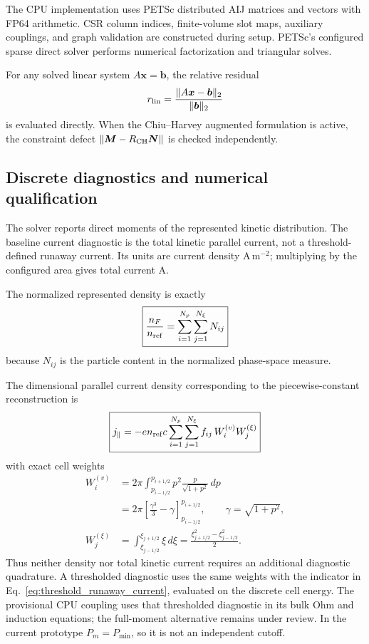 \documentclass[11pt]{article}
\begin{document}
The CPU implementation uses PETSc distributed AIJ matrices and vectors with FP64
arithmetic.  CSR column indices, finite-volume slot maps, auxiliary couplings, and graph
validation are constructed during setup.  PETSc's configured sparse direct solver
performs numerical factorization and triangular solves.

For any solved linear system $A\bm x=\bm b$, the relative residual
\begin{equation}
 r_{\rm lin}=\frac{\|A\bm x-\bm b\|_2}{\|\bm b\|_2}
 \label{eq:linear_residual}
\end{equation}
is evaluated directly.  When the Chiu--Harvey augmented formulation is active, the
constraint defect $\|\bm M-R_{\rm CH}\bm N\|$ is checked independently.

\subsection{Discrete diagnostics and numerical qualification}

The solver reports direct moments of the represented kinetic distribution.  The
baseline current diagnostic is the total kinetic parallel current, not a
threshold-defined runaway current.  Its units are current density
$\mathrm{A\,m^{-2}}$; multiplying by the configured area gives total current
$\mathrm{A}$.

The normalized represented density is exactly
\begin{equation}
 \boxed{
 \frac{n_F}{n_{\rm ref}}=\sum_{i=1}^{N_p}\sum_{j=1}^{N_\xi}N_{ij}
 }
 \label{eq:discrete_density}
\end{equation}
because $N_{ij}$ is the particle content in the normalized phase-space measure.

The dimensional parallel current density corresponding to the piecewise-constant
reconstruction is
\begin{equation}
 \boxed{
 j_\parallel
 =-e n_{\rm ref}c
 \sum_{i=1}^{N_p}\sum_{j=1}^{N_\xi}
 f_{ij}\,W_i^{(v)}W_j^{(\xi)}
 }
 \label{eq:discrete_current}
\end{equation}
with exact cell weights
\begin{align}
 W_i^{(v)}
 &=2\pi\int_{p_{i-1/2}}^{p_{i+1/2}}
       p^2\frac{p}{\sqrt{1+p^2}}\,dp
 \nonumber\\
 &=2\pi\left[
       \frac{\gamma^3}{3}-\gamma
       \right]_{p_{i-1/2}}^{p_{i+1/2}},
 \qquad \gamma=\sqrt{1+p^2},
 \label{eq:current_radial_weight}\\
 W_j^{(\xi)}
 &=\int_{\xi_{j-1/2}}^{\xi_{j+1/2}}\xi\,d\xi
 =\frac{\xi_{j+1/2}^2-\xi_{j-1/2}^2}{2}.
 \label{eq:current_pitch_weight}
\end{align}
Thus neither density nor total kinetic current requires an additional diagnostic
quadrature.  A thresholded diagnostic uses the same weights with the indicator in
Eq.~\eqref{eq:threshold_runaway_current}, evaluated on the discrete cell energy.
The provisional CPU coupling uses that thresholded diagnostic in its bulk Ohm and
induction equations; the full-moment alternative remains under review.  In the current
prototype $P_m=P_{\min}$, so it is not an independent cutoff.
\end{document}

